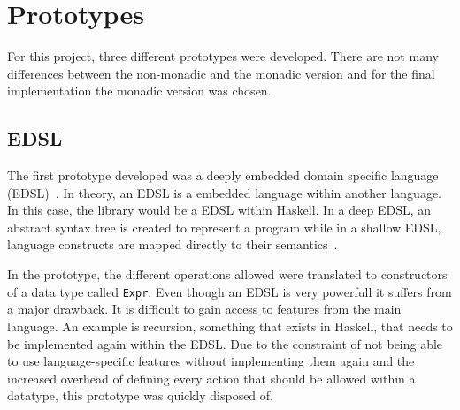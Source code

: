 \chapter{Prototypes}
\label{chapter:prototypes}
For this project, three different prototypes were developed. There are not many differences between the non-monadic and the monadic version and for the final implementation the monadic version was chosen.
\section{EDSL}
The first prototype developed was a deeply embedded domain specific language (EDSL)~\cite{haskell_edsl}. In theory, an EDSL is a embedded language within another language. In this case, the library would be a EDSL within Haskell. In a deep EDSL, an abstract syntax tree is created to represent a program while in a shallow EDSL, language constructs are mapped directly to their semantics~\cite{haskell-deep-shallow}.

In the prototype, the different operations allowed were translated to constructors of a data type called {\tt Expr}. Even though an EDSL is very powerfull it suffers from a major drawback. It is difficult to gain access to features from the main language. An example is recursion, something that exists in Haskell, that needs to be implemented again within the EDSL. Due to the constraint of not being able to use language-specific features without implementing them again and the increased overhead of defining every action that should be allowed within a datatype, this prototype was quickly disposed of.

